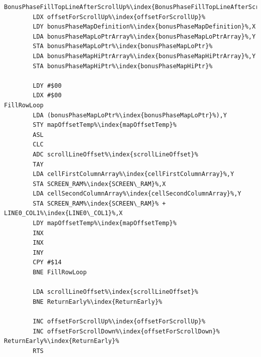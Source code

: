 \begin{minipage}[b]{0.45\linewidth}
\centering
\begin{lstlisting}[basicstyle=\tiny,escapechar=\%]
BonusPhaseFillTopLineAfterScrollUp%\index{BonusPhaseFillTopLineAfterScrollUp}%   
        LDX offsetForScrollUp%\index{offsetForScrollUp}%
        LDY bonusPhaseMapDefinition%\index{bonusPhaseMapDefinition}%,X
        LDA bonusPhaseMapLoPtrArray%\index{bonusPhaseMapLoPtrArray}%,Y
        STA bonusPhaseMapLoPtr%\index{bonusPhaseMapLoPtr}%
        LDA bonusPhaseMapHiPtrArray%\index{bonusPhaseMapHiPtrArray}%,Y
        STA bonusPhaseMapHiPtr%\index{bonusPhaseMapHiPtr}%

        LDY #$00
        LDX #$00
FillRowLoop
        LDA (bonusPhaseMapLoPtr%\index{bonusPhaseMapLoPtr}%),Y
        STY mapOffsetTemp%\index{mapOffsetTemp}%
        ASL 
        CLC 
        ADC scrollLineOffset%\index{scrollLineOffset}%
        TAY 
        LDA cellFirstColumnArray%\index{cellFirstColumnArray}%,Y
        STA SCREEN_RAM%\index{SCREEN\_RAM}%,X
        LDA cellSecondColumnArray%\index{cellSecondColumnArray}%,Y
        STA SCREEN_RAM%\index{SCREEN\_RAM}% + LINE0_COL1%\index{LINE0\_COL1}%,X
        LDY mapOffsetTemp%\index{mapOffsetTemp}%
        INX 
        INX 
        INY 
        CPY #$14
        BNE FillRowLoop

        LDA scrollLineOffset%\index{scrollLineOffset}%
        BNE ReturnEarly%\index{ReturnEarly}%

        INC offsetForScrollUp%\index{offsetForScrollUp}%
        INC offsetForScrollDown%\index{offsetForScrollDown}%
ReturnEarly%\index{ReturnEarly}%
        RTS 
\end{lstlisting}
\end{minipage}
\hspace{0.5cm}
